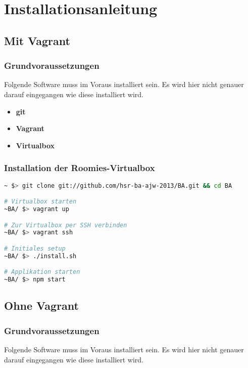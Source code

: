\chapter{Installationsanleitung}

\section{Mit Vagrant}

\subsection*{Grundvoraussetzungen}
Folgende Software muss im Voraus installiert sein. Es wird hier nicht genauer
darauf eingegangen wie diese installiert wird.

\begin{itemize}
	\item \textbf{git} \cite{git}
	\item \textbf{Vagrant} \cite{Vagrant}
	\item \textbf{Virtualbox} \cite{Virtualbox}
\end{itemize}

\subsection*{Installation der Roomies-Virtualbox}

\begin{lstlisting}[language=Bash, caption=Installationsanleitung Vagrant]
~ $> git clone git://github.com/hsr-ba-ajw-2013/BA.git && cd BA

# Virtualbox starten
~BA/ $> vagrant up

# Zur Virtualbox per SSH verbinden
~BA/ $> vagrant ssh

# Initiales setup
~BA/ $> ./install.sh

# Applikation starten
~BA/ $> npm start
\end{lstlisting}

\section{Ohne Vagrant}

\subsection*{Grundvoraussetzungen}
Folgende Software muss im Voraus installiert sein. Es wird hier nicht genauer
darauf eingegangen wie diese installiert wird.

